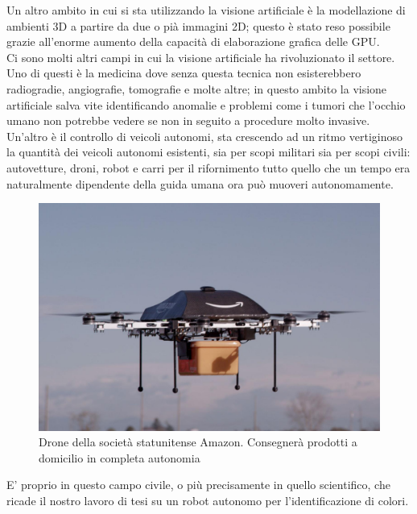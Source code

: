 Un altro ambito in cui si sta utilizzando la visione artificiale è la modellazione
di ambienti 3D a partire da due o pià immagini 2D; questo è stato reso possibile 
grazie all'enorme aumento della capacità di elaborazione grafica delle GPU.\\
Ci sono molti altri campi in cui la visione artificiale ha rivoluzionato il settore. 
Uno di questi è la medicina dove senza questa tecnica non esisterebbero radiogradie, angiografie,
tomografie e molte altre; in questo ambito la visione artificiale salva vite identificando
anomalie e problemi come i tumori che l'occhio umano non potrebbe vedere se non 
in seguito a procedure molto invasive.
Un'altro è il controllo di veicoli autonomi, sta crescendo ad un ritmo vertiginoso
la quantità dei veicoli autonomi esistenti, sia per scopi militari sia per scopi 
civili: autovetture, droni, robot e carri per il rifornimento tutto quello che 
un tempo era naturalmente dipendente della guida umana ora può muoveri autonomamente. 
\begin{figure}[!htb] \center
\includegraphics[scale=0.2]{immagini/amazon-air.png}
\caption{Drone della società statunitense Amazon. Consegnerà prodotti a domicilio in completa autonomia} 
\end{figure}
E' proprio in questo campo civile, o più precisamente in quello scientifico, 
che ricade il nostro lavoro di tesi su un robot autonomo per l'identificazione
di colori.

